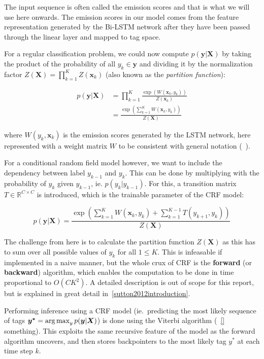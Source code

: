 The input sequence is often called the emission scores and that is what we will
use here onwards. The emission scores in our model comes from the feature
representation generated by the Bi-LSTM network after they have been passed
through the linear layer and mapped to tag space. 

For a regular classification problem, we could now compute $p(\bm{y}|\bm{X})$ by
taking the product of the probability of all $y_{k} \in \bm{y}$ and dividing it
by the normalization factor $Z(\bm{X}) = \prod_{k=1}^{K} Z(\bm{x}_{k})$ (also
known as the \textit{partition function}):

\begin{align*}
p(\bm{y}|\bm{X}) & = \prod_{k=1}^{K} \frac{\exp( W(\bm{x}_{k}, y_{k}) )} 
                                            {Z(\bm{x}_{k})} \\
                 & = \frac{\exp( \sum_{k=1}^{K} W(\bm{x}_k, y_{k}) )}
                                            {Z(\bm{X})}
\end{align*}

where $W(y_{k}, \bm{x}_{k})$ is the emission scores generated by the LSTM
network, here represented with a weight matrix $W$ to be consistent with general
notation (~\cite{treviso2019crf}).

For a conditional random field model however, we want to include the
dependency between label $y_{k-1}$ and $y_{k}$. This can be done by multiplying
with the probability of $y_{k}$ given $y_{k-1}$, ie. $p(y_{k}|y_{k-1})$. For
this, a transition matrix $T \in \mathbb{R}^{C \times C}$ is introduced, which 
is the trainable parameter of the CRF model:

\begin{equation*}
p(\bm{y}|\bm{X}) = \frac{\exp( \sum_{k=1}^{K} W(\bm{x}_k, y_{k}) +
                    \sum_{k=1}^{K-1} T(y_{k+1}, y_{k}) )}{Z(\bm{X})}
\end{equation*}

The challenge from here is to calculate the partition function $Z(\bm{X})$ as
this has to sum over all possible values of $y_{k}$ for all $1 \leq K$. This is
infeasable if implemented in a naive manner, but the whole crux of CRF is the
\textbf{forward} (or \textbf{backward}) algorithm, which enables the computation
to be done in time proportional to $O(CK^{2})$. A detailed description is out of
scope for this report, but is explained in great detail
in~\ref{sutton2012introduction}.

Performing inference using a CRF model (ie.\ predicting the most likely sequence
of tags $\bm{y^{*}} = \operatorname*{arg\,max}_{y}p(\bm{y}|\bm{X})$) is done using the Viterbi
algorithm (~\ref{} something). This exploits the same recursive feature of the
model as the forward algorithm uncovers, and then stores backpointers to the
most likely tag $y^{*}$ at each time step $k$.

